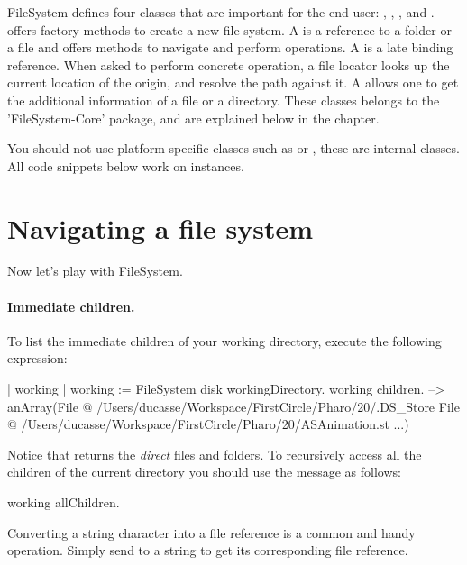 \documentclass[a4paper,10pt,twoside]{book}
\begin{document}
FileSystem defines four classes that are important for the end-user: , , , and .  offers factory methods to create a new file system. A  is a reference to a folder or a file and offers methods to navigate and perform operations. 
A  is a late binding reference. When asked to perform concrete operation, a file locator looks up the current location of the origin, and resolve the path against it. 
A  allows one to get the additional information of a file or a directory. These classes belongs to the 'FileSystem-Core' package, and are explained below in the chapter.

You should not use platform specific classes such as  or , these are internal classes. All code snippets below work on  instances.


\section{Navigating a file system}

Now let's play with FileSystem. 

\paragraph{Immediate children.}
To list the immediate children of your working directory, execute the following expression:

\begin{code}{}
| working |
working := FileSystem disk workingDirectory.
working children.
--> anArray(File @ /Users/ducasse/Workspace/FirstCircle/Pharo/20/.DS_Store File @ /Users/ducasse/Workspace/FirstCircle/Pharo/20/ASAnimation.st ...)
\end{code} 

Notice that  returns the \emph{direct} files and folders. 
To recursively access all the children of the current directory you should use the message  as follows:

\begin{code}{}
working allChildren.
\end{code}


Converting a string character into a file reference is a common and handy operation. Simply send  to a string to get its corresponding file reference.
\end{document}
